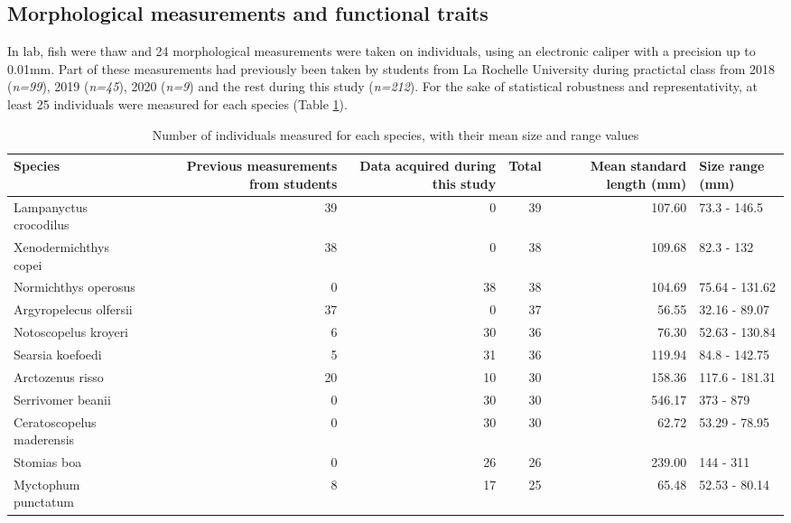 \subsection{Morphological measurements and functional traits}
In lab, fish were thaw and 24 morphological measurements were taken on individuals, using an electronic caliper with a precision up to 0.01mm. Part of these measurements had previously been taken by students from La Rochelle University during practictal class from 2018 (\textit{n=99}), 2019 (\textit{n=45}), 2020 (\textit{n=9}) and the rest during this study (\textit{n=212}). For the sake of statistical robustness and representativity, at least 25 individuals were measured for each species (Table \ref{table:spcount}).  

\begin{table}[ht]
\centering
\caption[Count, size's mean and range values of species]{Number of individuals measured for each species, with their mean size and range values}
\label{table:spcount}
\begin{adjustbox}{max width=1.1\textwidth,center}
\begin{tabular}{lrrr|rl}
  \hline
Species & Previous measurements from students & Data acquired during this study & Total & Mean standard length (mm) & Size range (mm) \\ 
  \hline
Lampanyctus crocodilus &  39 &   0 &  39 & 107.60 & 73.3 - 146.5 \\ 
  Xenodermichthys copei &  38 &   0 &  38 & 109.68 & 82.3 - 132 \\ 
  Normichthys operosus &   0 &  38 &  38 & 104.69 & 75.64 - 131.62 \\ 
  Argyropelecus olfersii &  37 &   0 &  37 & 56.55 & 32.16 - 89.07 \\ 
  Notoscopelus kroyeri &   6 &  30 &  36 & 76.30 & 52.63 - 130.84 \\ 
  Searsia koefoedi &   5 &  31 &  36 & 119.94 & 84.8 - 142.75 \\ 
  Arctozenus risso &  20 &  10 &  30 & 158.36 & 117.6 - 181.31 \\ 
  Serrivomer beanii &   0 &  30 &  30 & 546.17 & 373 - 879 \\ 
  Ceratoscopelus maderensis &   0 &  30 &  30 & 62.72 & 53.29 - 78.95 \\ 
  Stomias boa &   0 &  26 &  26 & 239.00 & 144 - 311 \\ 
  Myctophum punctatum &   8 &  17 &  25 & 65.48 & 52.53 - 80.14 \\ 
   \hline
\end{tabular}
\end{adjustbox}
\end{table}


